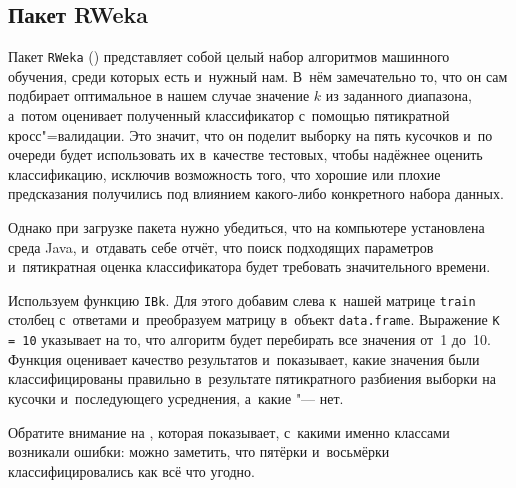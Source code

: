 \documentclass[final,pdftex]{../../template/epsilonj}\usepackage[]{graphicx}\usepackage[]{color}
\begin{document}
\subsection{Пакет RWeka} 

Пакет \texttt{RWeka} (\cite{RWekapackage14}) представляет собой целый набор алгоритмов машинного обучения, среди которых есть и~нужный нам. 
В~нём замечательно то, что он сам подбирает оптимальное в нашем случае значение $k$ из заданного диапазона, а~потом оценивает полученный классификатор с~помощью пятикратной кросс"=валидации. 
Это значит, что он поделит выборку на пять кусочков и~по очереди будет использовать их в~качестве тестовых, чтобы надёжнее оценить классификацию, исключив возможность того, что хорошие или плохие предсказания получились под влиянием какого-либо конкретного набора данных. 

Однако при загрузке пакета нужно убедиться, что на компьютере установлена среда Java, и~отдавать себе отчёт, что поиск подходящих параметров и~пятикратная оценка классификатора будет требовать значительного времени.

Используем функцию \texttt{IBk}. 
Для этого добавим слева к~нашей матрице \texttt{train} столбец с~ответами и~преобразуем матрицу в~объект \texttt{data.frame}. 
Выражение \texttt{K = 10} указывает на то, что алгоритм будет перебирать все значения от~1 до~10. 
Функция  оценивает качество результатов и~показывает, какие значения были классифицированы правильно в~результате пятикратного разбиения выборки на кусочки и~последующего усреднения, а~какие "--- нет. 

Обратите внимание на , которая показывает, с~какими именно классами возникали ошибки: можно заметить, что пятёрки и~восьмёрки классифицировались как всё что угодно.
\end{document}

